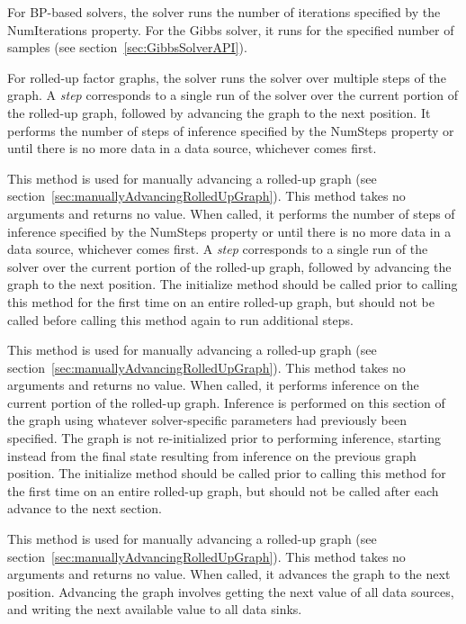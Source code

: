 For BP-based solvers, the solver runs the number of iterations specified by the NumIterations property.  For the Gibbs solver, it runs for the specified number of samples (see section~\ref{sec:GibbsSolverAPI}).

For rolled-up factor graphs, the solver runs the solver over multiple steps of the graph.  A \emph{step} corresponds to a single run of the solver over the current portion of the rolled-up graph, followed by advancing the graph to the next position.  It performs the number of steps of inference specified by the NumSteps property or until there is no more data in a data source, whichever comes first.


\label{sec:FactorGraph.continueSolve}

This method is used for manually advancing a rolled-up graph (see section~\ref{sec:manuallyAdvancingRolledUpGraph}).  This method takes no arguments and returns no value.  When called, it performs the number of steps of inference specified by the NumSteps property or until there is no more data in a data source, whichever comes first.  A \emph{step} corresponds to a single run of the solver over the current portion of the rolled-up graph, followed by advancing the graph to the next position.  The initialize method should be called prior to calling this method for the first time on an entire rolled-up graph, but should not be called before calling this method again to run additional steps.


This method is used for manually advancing a rolled-up graph (see section~\ref{sec:manuallyAdvancingRolledUpGraph}).  This method takes no arguments and returns no value.  When called, it performs inference on the current portion of the rolled-up graph.  Inference is performed on this section of the graph using whatever solver-specific parameters had previously been specified.  The graph is not re-initialized prior to performing inference, starting instead from the final state resulting from inference on the previous graph position.  The initialize method should be called prior to calling this method for the first time on an entire rolled-up graph, but should not be called after each advance to the next section.


This method is used for manually advancing a rolled-up graph (see section~\ref{sec:manuallyAdvancingRolledUpGraph}).  This method takes no arguments and returns no value.  When called, it advances the graph to the next position.  Advancing the graph involves getting the next value of all data sources, and writing the next available value to all data sinks.

